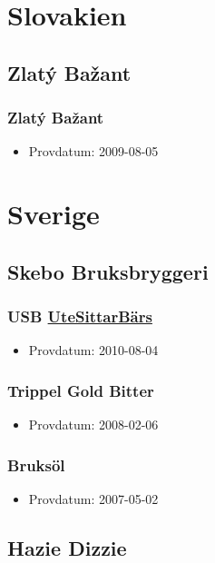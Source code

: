 \documentclass[11pt]{article}
\begin{document}
\section{Slovakien}
\label{sec:org32bca53}
\subsection{Zlatý Bažant}
\label{sec:org3c6787d}
\subsubsection{Zlatý Bažant}
\label{sec:orgd0c0d61}
\begin{itemize}
\item Provdatum: 2009-08-05
\end{itemize}
\section{Sverige}
\label{sec:org51ce5af}
\subsection{Skebo Bruksbryggeri}
\label{sec:org3d61df6}
\subsubsection{USB \underline{UteSittarBärs}}
\label{sec:org9aef4de}
\begin{itemize}
\item Provdatum: 2010-08-04
\end{itemize}
\subsubsection{Trippel Gold Bitter}
\label{sec:orgf70348f}
\begin{itemize}
\item Provdatum: 2008-02-06
\end{itemize}
\subsubsection{Bruksöl}
\label{sec:org2627584}
\begin{itemize}
\item Provdatum: 2007-05-02
\end{itemize}
\subsection{Hazie Dizzie}
\label{sec:orgb4a366f}
\end{document}
